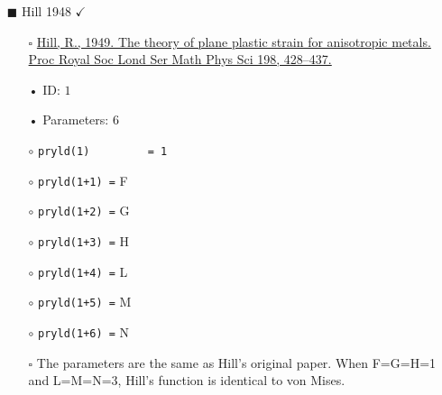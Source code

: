 \documentclass[11pt,a4paper,twoside,final,onecolumn,titlepage]{article}
\newcommand{\verified}{\hspace{0.5pt} {\LARGE $\checkmark$}}
\begin{document}
\begin{itemize}
	\item[\tiny$\blacksquare$] Hill 1948 \verified{}
	\begin{itemize}
		\item[\tiny$\square$] {\small \href{https://doi.org/10.1098/rspa.1949.0110}{Hill, R., 1949. The theory of plane plastic strain for anisotropic metals. Proc Royal Soc Lond Ser Math Phys Sci 198, 428–437.}}\\
		\item[•] ID: $1$
		\item[•] Parameters: $6$\\
		\item[$\circ$] \texttt{pryld(1)\,\,\,\,\,\,\,\,\,= 1}
		\item[$\circ$] \texttt{pryld(1+1) =} F
		\item[$\circ$] \texttt{pryld(1+2) =} G
		\item[$\circ$] \texttt{pryld(1+3) =} H
		\item[$\circ$] \texttt{pryld(1+4) =} L
		\item[$\circ$] \texttt{pryld(1+5) =} M
		\item[$\circ$] \texttt{pryld(1+6) =} N\\
		\item[\tiny$\square$] {\small The parameters are the same as Hill's original paper. When F=G=H=1 and L=M=N=3, Hill's function is identical to von Mises.}\\
	\end{itemize}

\end{itemize}
\end{document}
